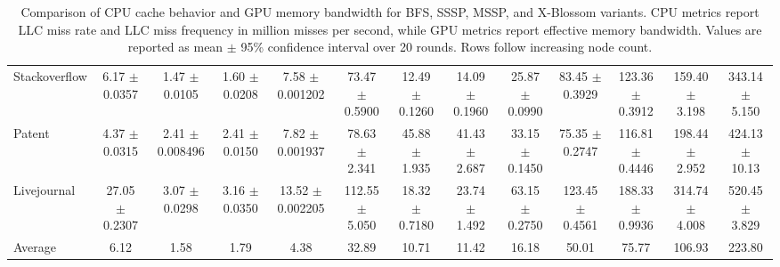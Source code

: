 \begin{table}[H]
{\begin{tabular}{l|cccc|cccc|cccc}
Stackoverflow & 6.17 $\pm$ 0.0357 & 1.47 $\pm$ 0.0105 & 1.60 $\pm$ 0.0208 & 7.58 $\pm$ 0.001202 & 73.47 $\pm$ 0.5900 & 12.49 $\pm$ 0.1260 & 14.09 $\pm$ 0.1960 & 25.87 $\pm$ 0.0990 & 83.45 $\pm$ 0.3929 & 123.36 $\pm$ 0.3912 & 159.40 $\pm$ 3.198 & 343.14 $\pm$ 5.150 \\
Patent        & 4.37 $\pm$ 0.0315 & 2.41 $\pm$ 0.008496 & 2.41 $\pm$ 0.0150 & 7.82 $\pm$ 0.001937 & 78.63 $\pm$ 2.341 & 45.88 $\pm$ 1.935 & 41.43 $\pm$ 2.687 & 33.15 $\pm$ 0.1450 & 75.35 $\pm$ 0.2747 & 116.81 $\pm$ 0.4446 & 198.44 $\pm$ 2.952 & 424.13 $\pm$ 10.13 \\
Livejournal   & 27.05 $\pm$ 0.2307 & 3.07 $\pm$ 0.0298 & 3.16 $\pm$ 0.0350 & 13.52 $\pm$ 0.002205 & 112.55 $\pm$ 5.050 & 18.32 $\pm$ 0.7180 & 23.74 $\pm$ 1.492 & 63.15 $\pm$ 0.2750 & 123.45 $\pm$ 0.4561 & 188.33 $\pm$ 0.9936 & 314.74 $\pm$ 4.008 & 520.45 $\pm$ 3.829 \\
\midrule
Average       & 6.12 & 1.58 & 1.79 & 4.38 & 32.89 & 10.71 & 11.42 & 16.18 & 50.01 & 75.77 & 106.93 & 223.80 \\
\bottomrule
\end{tabular}
}
\captionsetup{skip=4pt}
\caption{
Comparison of CPU cache behavior and GPU memory bandwidth for BFS, SSSP, MSSP, and X-Blossom variants.
CPU metrics report LLC miss rate and LLC miss frequency in million misses per second, while GPU metrics report effective memory bandwidth.
Values are reported as mean $\pm$ 95\% confidence interval over 20 rounds.
Rows follow increasing node count.
}
\label{tab:memory-ci}
\vspace{-4pt}
\end{table}

